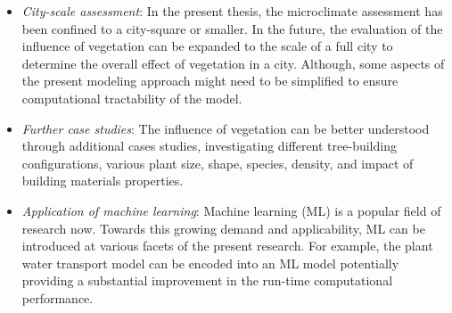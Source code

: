 \begin{itemize}
	\item \textit{City-scale assessment}: In the present thesis, the microclimate assessment has been confined to a city-square or smaller. In the future, the evaluation of the influence of vegetation can be expanded to the scale of a full city to determine the overall effect of vegetation in a city. Although, some aspects of the present modeling approach might need to be simplified to ensure computational tractability of the model.
	
	\item \textit{Further case studies}: The influence of vegetation can be better understood through additional cases studies, investigating different tree-building configurations, various plant size, shape, species, density, and impact of building materials properties.
	
	\item \textit{Application of machine learning}: Machine learning (ML) is a popular field of research now. Towards this growing demand and applicability, ML can be introduced at various facets of the present research. For example, the plant water transport model can be encoded into an ML model potentially providing a substantial improvement in the run-time computational performance. 
	
\end{itemize}
